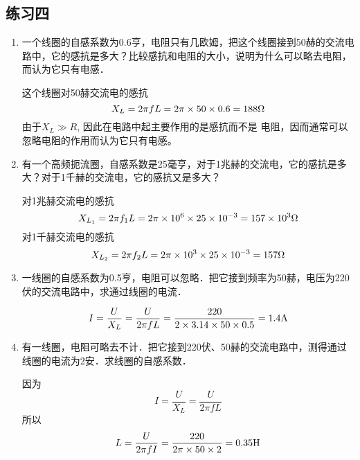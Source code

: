 \subsection{练习四}
\begin{enumerate}
    \item 一个线圈的自感系数为0.6亨，电阻只有几欧姆，把这个线圈接到50赫的交流电路中，它的感抗是多大？比较感抗和电阻的大小，说明为什么可以略去电阻，而认为它只有电感．


    \begin{solution}
        这个线圈对50赫交流电的感抗
    \[    X_L=2\pi fL=2\pi \times50\times0.6=188\Omega\]
        由于$X_L\gg R$, 因此在电路中起主要作用的是感抗而不是
        电阻，因而通常可以忽略电阻的作用而认为它只有电感。
    \end{solution}
    
    \item 有一个高频扼流圈，自感系数是25毫亨，对于1兆赫的交流电，它的感抗是多大？对于1千赫的交流电，它的感抗又是多大？


    \begin{solution}
        对1兆赫交流电的感抗
        \[X_{L_1}=2\pi f_1L=2\pi\times10^6\times25\times10^{-3}=157\times10^3\Omega\]
        对1千赫交流电的感抗
        \[X_{L_2}=2\pi f_2L=2\pi\times10^3\times25\times10^{-3}=157\Omega\]
    \end{solution}
    
    \item 一线圈的自感系数为0.5亨，电阻可以忽略．把它接到频率为50赫，电压为220伏的交流电路中，求通过线圈的电流．


    \begin{solution}
 \[I=\frac{U}{X_L}=\frac{U}{2\pi fL}=\frac{220}{2\times 3.14\times 50\times 0.5}=1.4{\rm A}\]   
    \end{solution}
    
    \item 有一线圈，电阻可略去不计．把它接到220伏、50赫的交流电路中，测得通过线圈的电流为2安．求线圈的自感系数．


    \begin{solution}
    因为\[I=\frac{U}{X_L}=\frac{U}{2\pi fL }\]
    所以
    \[L=\frac{U}{2\pi fI}=\frac{220}{2\pi\times 50\times 2}=0.35{\rm H}\]
    \end{solution}
    
\end{enumerate}


